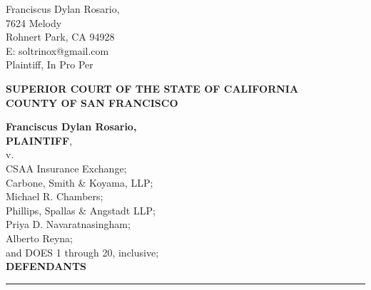 

\nolinenumbers
\begin{singlespace}
Franciscus Dylan Rosario, \\
7624 Melody \\
Rohnert Park, CA 94928 \\
E: soltrinox@gmail.com \\
Plaintiff, In Pro Per \\
\end{singlespace}
\vspace*{9mm}
\begin{tightcenter}
\textbf{SUPERIOR COURT OF THE STATE OF CALIFORNIA} \\
\textbf{COUNTY OF SAN FRANCISCO}
\end{tightcenter}
\vspace*{2.25mm}
\nolinenumbers
\begin{minipage}[t]{3in}
    \raggedright
    \textbf{Franciscus Dylan Rosario,} \\ \textbf{PLAINTIFF}, \\
    \hspace{1cm} v. \\
    \small
    CSAA Insurance Exchange; \\
    Carbone, Smith \& Koyama, LLP; \\
    Michael R. Chambers; \\
    Phillips, Spallas \& Angstadt LLP; \\
    Priya D. Navaratnasingham; \\
    Alberto Reyna; \\
    and DOES 1 through 20, inclusive; \\
    \normalsize
    \textbf{DEFENDANTS}
    \makebox[3in]{\hrulefill}
\end{minipage}%
\hspace{3mm}
\begin{minipage}[t]{0.5pt}
    \vspace{0pt}
    \rule{0.5pt}{3.1in}
\end{minipage}
\hspace{3mm}
